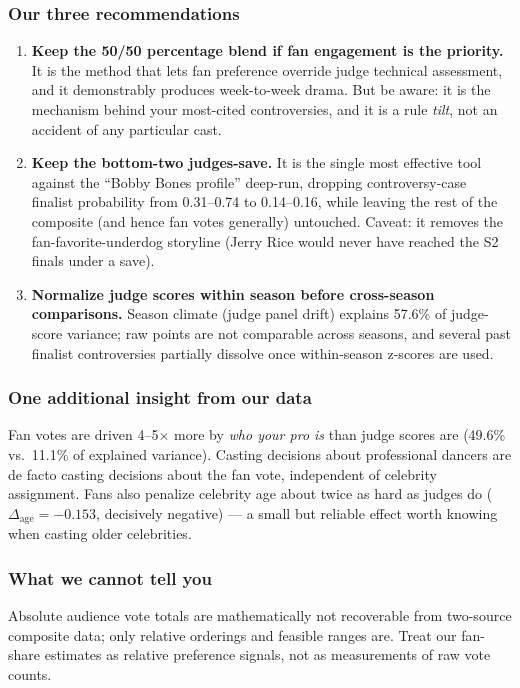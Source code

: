 \documentclass{article}
\begin{document}
\subsubsection*{Our three recommendations}
\begin{enumerate}
  \item \textbf{Keep the 50/50 percentage blend if fan engagement is the priority.} It is the method that lets fan preference override judge technical assessment, and it demonstrably produces week-to-week drama. But be aware: it is the mechanism behind your most-cited controversies, and it is a rule \emph{tilt}, not an accident of any particular cast.
  \item \textbf{Keep the bottom-two judges-save.} It is the single most effective tool against the ``Bobby Bones profile'' deep-run, dropping controversy-case finalist probability from 0.31--0.74 to 0.14--0.16, while leaving the rest of the composite (and hence fan votes generally) untouched. Caveat: it removes the fan-favorite-underdog storyline (Jerry Rice would never have reached the S2 finals under a save).
  \item \textbf{Normalize judge scores within season before cross-season comparisons.} Season climate (judge panel drift) explains 57.6\% of judge-score variance; raw points are not comparable across seasons, and several past finalist controversies partially dissolve once within-season z-scores are used.
\end{enumerate}

\subsubsection*{One additional insight from our data}
Fan votes are driven 4--5$\times$ more by \emph{who your pro is} than judge scores are (49.6\% vs.\ 11.1\% of explained variance). Casting decisions about professional dancers are de facto casting decisions about the fan vote, independent of celebrity assignment. Fans also penalize celebrity age about twice as hard as judges do ($\Delta_{\text{age}} = -0.153$, decisively negative) --- a small but reliable effect worth knowing when casting older celebrities.

\subsubsection*{What we cannot tell you}
Absolute audience vote totals are mathematically not recoverable from two-source composite data; only relative orderings and feasible ranges are. Treat our fan-share estimates as relative preference signals, not as measurements of raw vote counts.
\end{document}
